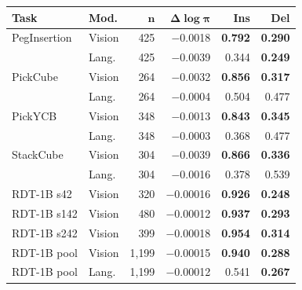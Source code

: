 \documentclass{article}
\begin{document}
\begin{table}[t!]
\centering
\footnotesize
\setlength{\tabcolsep}{4pt}
\begin{tabular}{@{}ll r r rr@{}}
\toprule
\textbf{Task} & \textbf{Mod.} & $\boldsymbol{n}$ & $\boldsymbol{\Delta\log\pi}$ & \textbf{Ins} & \textbf{Del} \\
\midrule
PegInsertion & Vision & 425 & $-$0.0018 & \textbf{0.792} & \textbf{0.290} \\
& Lang. & 425 & $-$0.0039 & 0.344 & \textbf{0.249} \\
\midrule
\rowcolor{gray!6}
PickCube & Vision & 264 & $-$0.0032 & \textbf{0.856} & \textbf{0.317} \\
\rowcolor{gray!6}
& Lang. & 264 & $-$0.0004 & 0.504 & 0.477 \\
\midrule
PickYCB & Vision & 348 & $-$0.0013 & \textbf{0.843} & \textbf{0.345} \\
& Lang. & 348 & $-$0.0003 & 0.368 & 0.477 \\
\midrule
\rowcolor{gray!6}
StackCube & Vision & 304 & $-$0.0039 & \textbf{0.866} & \textbf{0.336} \\
\rowcolor{gray!6}
& Lang. & 304 & $-$0.0016 & 0.378 & 0.539 \\
\midrule
\midrule
RDT-1B s42 & Vision & 320 & $-$0.00016 & \textbf{0.926} & \textbf{0.248} \\
RDT-1B s142 & Vision & 480 & $-$0.00012 & \textbf{0.937} & \textbf{0.293} \\
RDT-1B s242 & Vision & 399 & $-$0.00018 & \textbf{0.954} & \textbf{0.314} \\
\rowcolor{gray!6}
RDT-1B pool & Vision & 1{,}199 & $-$0.00015 & \textbf{0.940} & \textbf{0.288} \\
\rowcolor{gray!6}
RDT-1B pool & Lang. & 1{,}199 & $-$0.00012 & 0.541 & \textbf{0.267} \\
\bottomrule
\end{tabular}

\end{table}
\end{document}
